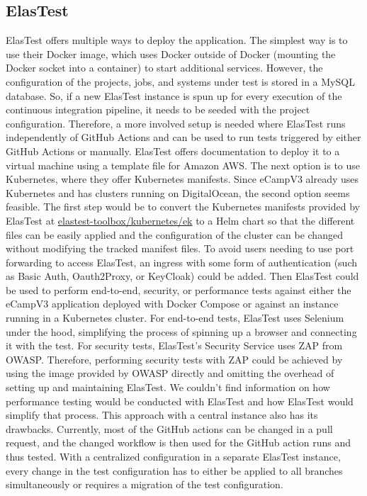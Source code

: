 \documentclass[conference]{IEEEtran}
\begin{document}
\subsection{ElasTest}
ElasTest offers multiple ways to deploy the application.
The simplest way is to use their Docker image, which uses Docker outside of Docker\cite{medium-docker-outside-of-docker} (mounting the Docker socket into a container)
to start additional services\cite{elastest-docs-mini}.
However, the configuration of the projects, jobs, and systems under test is stored in a MySQL database.
So, if a new ElasTest instance is spun up for every execution of the continuous integration pipeline,
it needs to be seeded with the project configuration.
Therefore, a more involved setup is needed where ElasTest runs independently of GitHub Actions and can be used to run tests triggered by either GitHub Actions or manually.
ElasTest offers documentation to deploy it to a virtual machine using a template file for Amazon AWS\cite{elastest-docs-aws}.
The next option is to use Kubernetes, where they offer Kubernetes manifests\cite{elastest-docs-kubernetes}.
Since eCampV3 already uses Kubernetes and has clusters running on DigitalOcean, the second option seems feasible.
The first step would be to convert the Kubernetes manifests provided by ElasTest at \href{https://github.com/elastest/elastest-toolbox/tree/b8cd58c3061b10f018824efbffcb9ed88a3e2ef0/kubernetes/ek}{elastest-toolbox/kubernetes/ek}
to a Helm chart so that the different files can be easily applied and the configuration of the cluster can be changed without modifying the tracked manifest files.
To avoid users needing to use port forwarding to access ElasTest, an ingress with some form of authentication
(such as Basic Auth\cite{kubernetes-basic-auth-ingress}, Oauth2Proxy\cite{github-oauth2-proxy}, or KeyCloak\cite{keycloak-kubernetes}) could be added.
\newline
Then ElasTest could be used to perform end-to-end, security, or performance tests against either the eCampV3 application deployed with Docker Compose or against
an instance running in a Kubernetes cluster.
For end-to-end tests, ElasTest uses Selenium under the hood, simplifying the process of spinning up a browser and connecting it with the test.
For security tests, ElasTest's Security Service uses ZAP from OWASP\cite{website-owasp-zap, elastest-code-ess-dockerfile}.
Therefore, performing security tests with ZAP could be achieved by using the image provided by OWASP directly and omitting
the overhead of setting up and maintaining ElasTest.
We couldn't find information on how performance testing would be conducted with ElasTest and how ElasTest would simplify that process.
\newline
This approach with a central instance also has its drawbacks.
Currently, most of the GitHub actions can be changed in a pull request, and the changed workflow is then used
for the GitHub action runs and thus tested.
With a centralized configuration in a separate ElasTest instance, every change in the test configuration has to either
be applied to all branches simultaneously or requires a migration of the test configuration.
\end{document}
